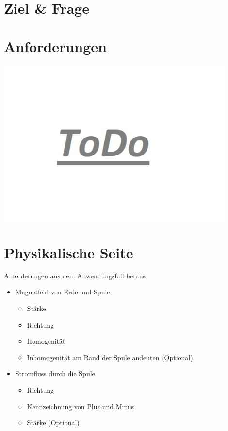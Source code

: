 \part{Ziel \& Frage}
\label{part:goal}

\part{Anforderungen}
\begin{frame}[fragile]{}
\begin{center}
\includegraphics[width=0.9\textwidth]{images/ToDo.jpg}
\end{center}
\end{frame}

\part{Physikalische Seite}
\begin{frame}[fragile]{Anforderungen aus dem Anwendungsfall heraus}
\begin{itemize}
\item Magnetfeld von Erde und Spule
\begin{itemize}
\item Stärke
\item Richtung
\item Homogenität
\item Inhomogenität am Rand der Spule andeuten (Optional) 
\end{itemize}
\item Stromfluss durch die Spule
\begin{itemize}
\item Richtung
\item Kennzeichnung von Plus und Minus
\item Stärke (Optional) 
\end{itemize}
\end{itemize}
\end{frame}


